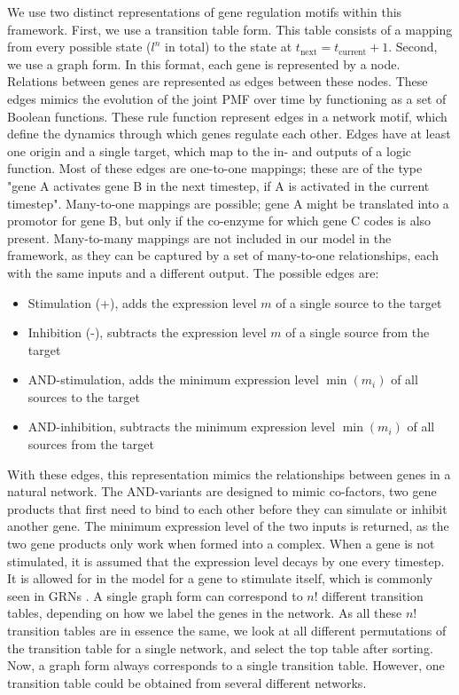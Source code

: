 \documentclass[../main.tex]{subfiles}
\begin{document}
We use two distinct representations of gene regulation motifs within this framework.
First, we use a transition table form.
This table consists of a mapping from every possible state ($l^n$ in total) to the state at $t_\mathrm{next} = t_\mathrm{current} + 1$.
Second, we use a graph form.
In this format, each gene is represented by a node.
Relations between genes are represented as edges between these nodes.
These edges mimics the evolution of the joint PMF over time by functioning as a set of Boolean functions.
These rule function represent edges in a network motif, which define the dynamics through which genes regulate each other.
Edges have at least one origin and a single target, which map to the in- and outputs of a logic function.
Most of these edges are one-to-one mappings; these are of the type "gene A activates gene B in the next timestep, if A is activated in the current timestep".
Many-to-one mappings are possible; gene A might be translated into a promotor for gene B, but only if the co-enzyme for which gene C codes is also present.
Many-to-many mappings are not included in our model in the framework, as they can be captured by a set of many-to-one relationships, each with the same inputs and a different output.
The possible edges are:
%
\begin{itemize}
\item Stimulation (+), adds the expression level $m$ of a single source to the target
\item Inhibition (-), subtracts the expression level $m$ of a single source from the target
\item AND-stimulation, adds the minimum expression level $\min(m_i)$ of all sources to the target
\item AND-inhibition, subtracts the minimum expression level $\min(m_i)$ of all sources from the target
\end{itemize}
%
With these edges, this representation mimics the relationships between genes in a natural network.
The AND-variants are designed to mimic co-factors, two gene products that first need to bind to each other before they can simulate or inhibit another gene.
The minimum expression level of the two inputs is returned, as the two gene products only work when formed into a complex.
When a gene is not stimulated, it is assumed that the expression level decays by one every timestep.
It is allowed for in the model for a gene to stimulate itself, which is commonly seen in GRNs \cite{}.
A single graph form can correspond to $n!$ different transition tables, depending on how we label the genes in the network.
As all these $n!$ transition tables are in essence the same, we look at all different permutations of the transition table for a single network, and select the top table after sorting.
Now, a graph form always corresponds to a single transition table. 
However, one transition table could be obtained from several different networks.
\end{document}
